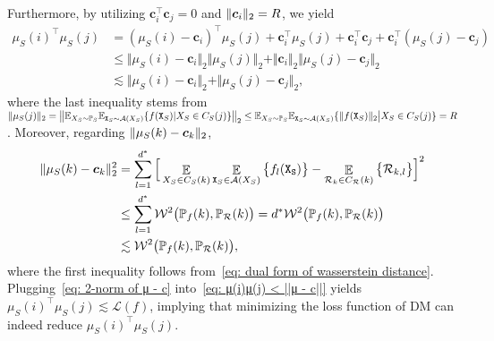 Furthermore, by utilizing $\bm{c}_i^\top \bm{c}_j = 0$ and $\Vert{\bm{c}_i}\Vert_2 = R$, we yield
\begin{align}\label{eq: μ(i)μ(j) < ||μ - c||}
    \mu_S(i)^{\top}\mu_S(j) &= (\mu_S(i) - \bm{c}_i)^{\top}\mu_S(j) + \bm{c}_i^{\top}\mu_S(j) + \bm{c}_i^\top \bm{c}_j + \bm{c}_i^\top(\mu_S(j) - \bm{c}_j)\nonumber \\
    &\leq \Vert\mu_S(i) - \bm{c}_i\Vert_2\Vert\mu_S(j)\Vert_2 + \Vert \bm{c}_i\Vert_2\Vert\mu_S(j) - \bm{c}_j\Vert_2 \nonumber\\
    &\lesssim \Vert\mu_S(i) - \bm{c}_i\Vert_2 + \Vert\mu_S(j) - \bm{c}_j\Vert_2,
\end{align}
where the last inequality stems from $\Vert{\mu_S(j)}\Vert_2 = \big\Vert\mathbb{E}_{X_S \sim \mathbb{P}_S}\mathbb{E}_{\mathtt{X}_S \sim \mathcal{A}(X_S)}\{f(\mathtt{X}_S)\vert X_S \in C_S(j)\}\big\Vert_2 \leq \mathbb{E}_{X_S \sim \mathbb{P}_S}\mathbb{E}_{\mathtt{X}_S \sim \mathcal{A}(X_S)}\{\Vert{f(\mathtt{X}_S)}\Vert_2\big\vert X_S \in C_S(j)\} = R$. Moreover, regarding $\Vert{\mu_S(k) - \bm{c}_k}\Vert_2$,
\begin{align}\label{eq: 2-norm of μ - c}
    \Vert{\mu_S(k) - \bm{c}_k}\Vert^2_2 &=\sum_{l=1}^{d^*}\Big[\mathop{\mathbb{E}}_{X_S \in C_S(k)}\mathop{\mathbb{E}}_{\mathtt{X}_S \in \mathcal{A}(X_S)}\big\{f_l(\mathtt{X_S})\big\} - \mathop{\mathbb{E}}_{\mathcal{R}_k \in C_\mathcal{R}(k)}\big\{\mathcal{R}_{k,l}\big\}\Big]^2 \nonumber\\
    &\leq \sum_{l=1}^{d^*}\mathcal{W}^2\big(\mathbb{P}_f(k), \mathbb{P}_\mathcal{R}(k)\big) = d^*\mathcal{W}^2\big(\mathbb{P}_f(k), \mathbb{P}_\mathcal{R}(k)\big) \nonumber\\
    &\lesssim \mathcal{W}^2\big(\mathbb{P}_f(k), \mathbb{P}_\mathcal{R}(k)\big),
\end{align}
where the first inequality follows from~\eqref{eq: dual form of wasserstein distance}. Plugging~\eqref{eq: 2-norm of μ - c} into~\eqref{eq: μ(i)μ(j) < ||μ - c||} yields $\mu_S(i)^{\top}\mu_S(j) \lesssim \mathcal{L}(f)$, implying that minimizing the loss function of DM can indeed reduce $\mu_S(i)^{\top}\mu_S(j)$.

